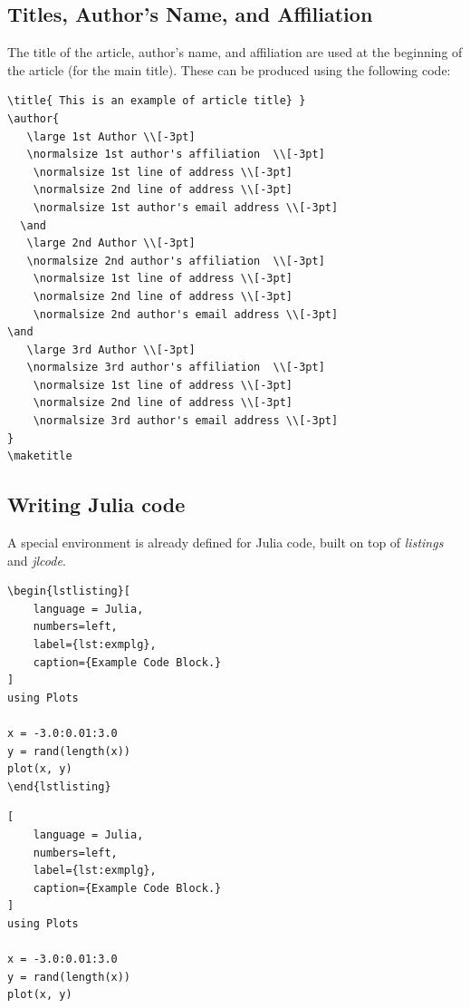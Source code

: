 \documentclass{juliacon}
\begin{document}
\subsection{Titles, Author's Name, and Affiliation}
\label{subsub:title_auth}
The title of the article, author's name, and affiliation are used at the
beginning of the article (for the main title). These can be produced
using the following code:

\begin{verbatim}
\title{ This is an example of article title} }
\author{
   \large 1st Author \\[-3pt]
   \normalsize 1st author's affiliation  \\[-3pt]
    \normalsize 1st line of address \\[-3pt]
    \normalsize 2nd line of address \\[-3pt]
    \normalsize	1st author's email address \\[-3pt]
  \and
   \large 2nd Author \\[-3pt]
   \normalsize 2nd author's affiliation  \\[-3pt]
    \normalsize 1st line of address \\[-3pt]
    \normalsize 2nd line of address \\[-3pt]
    \normalsize	2nd author's email address \\[-3pt]
\and
   \large 3rd Author \\[-3pt]
   \normalsize 3rd author's affiliation  \\[-3pt]
    \normalsize 1st line of address \\[-3pt]
    \normalsize 2nd line of address \\[-3pt]
    \normalsize	3rd author's email address \\[-3pt]
}
\maketitle
\end{verbatim}

\subsection{Writing Julia code}

A special environment is already defined for Julia code,
built on top of \textit{listings} and \textit{jlcode}.

\begin{verbatim}
\begin{lstlisting}[
    language = Julia,
    numbers=left,
    label={lst:exmplg},
    caption={Example Code Block.}
]
using Plots

x = -3.0:0.01:3.0
y = rand(length(x))
plot(x, y)
\end{lstlisting}
\end{verbatim}
\begin{lstlisting}[
    language = Julia,
    numbers=left,
    label={lst:exmplg},
    caption={Example Code Block.}
]
using Plots

x = -3.0:0.01:3.0
y = rand(length(x))
plot(x, y)
\end{lstlisting}
\end{document}
